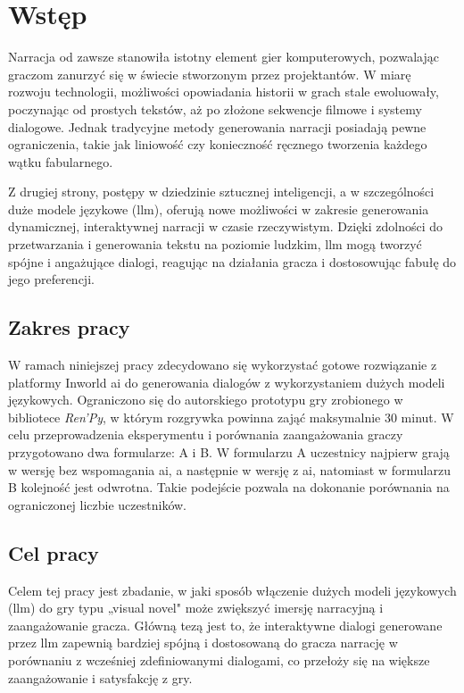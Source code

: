 
\chapter*{Wstęp}\label{chapter:introduction}

Narracja od zawsze stanowiła istotny element gier komputerowych, pozwalając graczom zanurzyć się w świecie
stworzonym przez projektantów. W miarę rozwoju technologii, możliwości opowiadania historii w grach stale
ewoluowały, poczynając od prostych tekstów, aż po złożone sekwencje filmowe i systemy dialogowe. Jednak tradycyjne
metody generowania narracji posiadają pewne ograniczenia, takie jak liniowość czy konieczność ręcznego tworzenia
każdego wątku fabularnego.

Z drugiej strony, postępy w dziedzinie sztucznej inteligencji, a w szczególności duże modele językowe (\gls{llm}),
oferują nowe możliwości w zakresie generowania dynamicznej, interaktywnej narracji w czasie rzeczywistym. Dzięki
zdolności do przetwarzania i generowania tekstu na poziomie ludzkim, \gls{llm} mogą tworzyć spójne i angażujące dialogi,
reagując na działania gracza i dostosowując fabułę do jego preferencji.

\section*{Zakres pracy}

W ramach niniejszej pracy zdecydowano się wykorzystać gotowe rozwiązanie z platformy Inworld \gls{ai} do generowania
dialogów z wykorzystaniem dużych modeli językowych. Ograniczono się do autorskiego prototypu gry zrobionego w
bibliotece \textit{Ren'Py}, w którym rozgrywka powinna zająć maksymalnie 30 minut. W celu przeprowadzenia eksperymentu
i porównania zaangażowania graczy przygotowano dwa formularze: A i B. W formularzu A uczestnicy najpierw grają
w wersję bez wspomagania \gls{ai}, a następnie w wersję z \gls{ai}, natomiast w formularzu B kolejność jest odwrotna.
Takie podejście pozwala na dokonanie porównania na ograniczonej liczbie uczestników.

\section*{Cel pracy}

Celem tej pracy jest zbadanie, w jaki sposób włączenie dużych modeli językowych (\gls{llm}) do gry typu „visual novel"
może zwiększyć imersję narracyjną i zaangażowanie gracza. Główną tezą jest to, że interaktywne dialogi generowane
przez \gls{llm} zapewnią bardziej spójną i dostosowaną do gracza narrację w porównaniu z wcześniej zdefiniowanymi
dialogami, co przełoży się na większe zaangażowanie i satysfakcję z gry.


